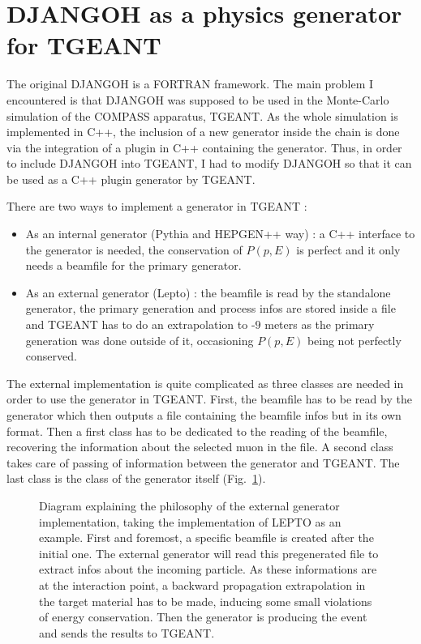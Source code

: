 
\section{DJANGOH as a physics generator for TGEANT}

The original DJANGOH is a FORTRAN framework. The main problem I encountered is that DJANGOH was supposed to be used in the Monte-Carlo simulation of the COMPASS apparatus, TGEANT. As the whole simulation is implemented in C++, the inclusion of a new generator inside the chain is done via the integration of a plugin in C++ containing the generator. Thus, in order to include DJANGOH into TGEANT, I had to modify DJANGOH so that it can be used as a C++ plugin generator by TGEANT.

There are two ways to implement a generator in TGEANT :
\begin{itemize}
\item As an internal generator (Pythia and HEPGEN++ way) : a C++ interface to the
generator is needed, the conservation of $P(p,E)$ is perfect and it only needs a
beamfile for the primary generator.
\item As an external generator (Lepto) : the beamfile is read by the standalone
generator, the primary generation and process infos are stored inside a file and
TGEANT has to do an extrapolation to -$9$ meters as the primary generation was done
outside of it, occasioning $P(p,E)$ being not perfectly conserved.
\end{itemize}

The external implementation is quite complicated as three classes are needed in order
to use the generator in TGEANT. First, the beamfile has to be read by the generator
which then outputs a file containing the beamfile infos but in its own format.
Then a first class has to be dedicated to the reading of the beamfile, recovering
the information about the selected muon in the file. A second class takes care of
passing of information between the generator and TGEANT. The last class is the
class of the generator itself (Fig.~\ref{fig:leptoex}).

\begin{figure}[!htb]
\centerline{}
\caption{Diagram explaining the philosophy of the external generator implementation, taking the
implementation of LEPTO as an example. First and foremost, a specific beamfile is created after the
initial one. The external generator will read this pregenerated file to extract infos about the incoming
particle. As these informations are at the interaction point, a backward propagation extrapolation in the
target material has to be made, inducing some small violations of energy conservation.
Then the generator is producing the event and sends the results to TGEANT.}\label{fig:leptoex}
\end{figure}

